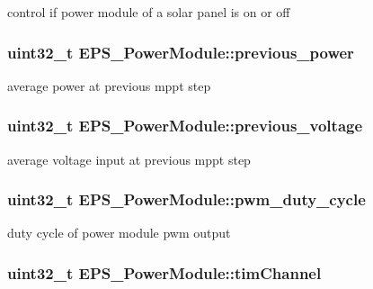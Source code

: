 control if power module of a solar panel is on or off \hypertarget{struct_e_p_s___power_module_a2b2a75d0b1e63c0bcbed3261fd416e86}{
\subsubsection[{previous\-\_\-power}]{\setlength{\rightskip}{0pt plus 5cm}uint32\-\_\-t E\-P\-S\-\_\-\-Power\-Module\-::previous\-\_\-power}}\label{struct_e_p_s___power_module_a2b2a75d0b1e63c0bcbed3261fd416e86}
average power at previous mppt step \hypertarget{struct_e_p_s___power_module_afb65c6bd90e52b0ecaca4594124170e2}{
\subsubsection[{previous\-\_\-voltage}]{\setlength{\rightskip}{0pt plus 5cm}uint32\-\_\-t E\-P\-S\-\_\-\-Power\-Module\-::previous\-\_\-voltage}}\label{struct_e_p_s___power_module_afb65c6bd90e52b0ecaca4594124170e2}
average voltage input at previous mppt step \hypertarget{struct_e_p_s___power_module_a52c830161b366fecd8d4307c5a33a287}{
\subsubsection[{pwm\-\_\-duty\-\_\-cycle}]{\setlength{\rightskip}{0pt plus 5cm}uint32\-\_\-t E\-P\-S\-\_\-\-Power\-Module\-::pwm\-\_\-duty\-\_\-cycle}}\label{struct_e_p_s___power_module_a52c830161b366fecd8d4307c5a33a287}
duty cycle of power module pwm output \hypertarget{struct_e_p_s___power_module_a8322d9097b46a1eb94ce87e57dc4dea4}{
\subsubsection[{tim\-Channel}]{\setlength{\rightskip}{0pt plus 5cm}uint32\-\_\-t E\-P\-S\-\_\-\-Power\-Module\-::tim\-Channel}}\label{struct_e_p_s___power_module_a8322d9097b46a1eb94ce87e57dc4dea4}

